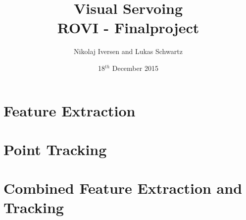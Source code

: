 \documentclass[12pt,a4paper,conference]{IEEEtran}
\begin{document}
\raggedbottom

\title{Visual Servoing\\ \large{ROVI - Finalproject}}
\author{Nikolaj Iversen and Lukas Schwartz}
\date{18$^{th}$ December 2015}

\maketitle


\section{Feature Extraction}

% 





\section{Point Tracking}





\section{Combined Feature Extraction and Tracking}
\label{sec:combinedSystem}




\pagebreak
\appendices


\end{document}
